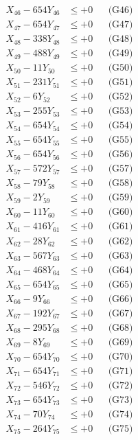 \documentclass[a4paper,10pt]{article}
\begin{document}
{\begin{align}
X_{46} - 654Y_{46} &\leq +0 && \text{(G46)} \\
X_{47} - 654Y_{47} &\leq +0 && \text{(G47)} \\
X_{48} - 338Y_{48} &\leq +0 && \text{(G48)} \\
X_{49} - 488Y_{49} &\leq +0 && \text{(G49)} \\
X_{50} - 11Y_{50} &\leq +0 && \text{(G50)} \\
\allowbreak
X_{51} - 231Y_{51} &\leq +0 && \text{(G51)} \\
X_{52} - 6Y_{52} &\leq +0 && \text{(G52)} \\
X_{53} - 255Y_{53} &\leq +0 && \text{(G53)} \\
X_{54} - 654Y_{54} &\leq +0 && \text{(G54)} \\
X_{55} - 654Y_{55} &\leq +0 && \text{(G55)} \\
X_{56} - 654Y_{56} &\leq +0 && \text{(G56)} \\
X_{57} - 572Y_{57} &\leq +0 && \text{(G57)} \\
X_{58} - 79Y_{58} &\leq +0 && \text{(G58)} \\
X_{59} - 2Y_{59} &\leq +0 && \text{(G59)} \\
X_{60} - 11Y_{60} &\leq +0 && \text{(G60)} \\
\allowbreak
X_{61} - 416Y_{61} &\leq +0 && \text{(G61)} \\
X_{62} - 28Y_{62} &\leq +0 && \text{(G62)} \\
X_{63} - 567Y_{63} &\leq +0 && \text{(G63)} \\
X_{64} - 468Y_{64} &\leq +0 && \text{(G64)} \\
X_{65} - 654Y_{65} &\leq +0 && \text{(G65)} \\
X_{66} - 9Y_{66} &\leq +0 && \text{(G66)} \\
X_{67} - 192Y_{67} &\leq +0 && \text{(G67)} \\
X_{68} - 295Y_{68} &\leq +0 && \text{(G68)} \\
X_{69} - 8Y_{69} &\leq +0 && \text{(G69)} \\
X_{70} - 654Y_{70} &\leq +0 && \text{(G70)} \\
\allowbreak
X_{71} - 654Y_{71} &\leq +0 && \text{(G71)} \\
X_{72} - 546Y_{72} &\leq +0 && \text{(G72)} \\
X_{73} - 654Y_{73} &\leq +0 && \text{(G73)} \\
X_{74} - 70Y_{74} &\leq +0 && \text{(G74)} \\
X_{75} - 264Y_{75} &\leq +0 && \text{(G75)} \\

\end{align}}
\end{document}
